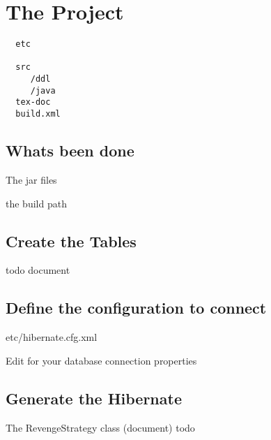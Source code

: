 \section{The Project}



\begin{verbatim}
  etc

  src
     /ddl
     /java
  tex-doc
  build.xml
\end{verbatim}
\subsection{Whats been done}
The jar files

the build path



\subsection{Create the Tables}

todo document

\subsection{Define the configuration to connect}

etc/hibernate.cfg.xml

Edit for your database connection properties

\subsection{Generate the Hibernate }

The RevengeStrategy class (document) todo